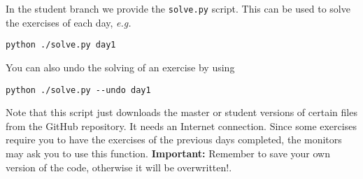 In the student branch we provide the \verb+solve.py+ script. This can be used
to solve the exercises of each day, \emph{e.g.}

\begin{verbatim}
python ./solve.py day1
\end{verbatim}

\noindent You can also undo the solving of an exercise by using

\begin{verbatim}
python ./solve.py --undo day1
\end{verbatim}

Note that this script just downloads the master or student versions of certain files from the GitHub repository. It needs an Internet connection. Since some exercises require you to have the exercises of the previous days completed, the monitors may ask you to use this function. \textbf{Important:} Remember to save your own version of the code, otherwise it will be overwritten!.
